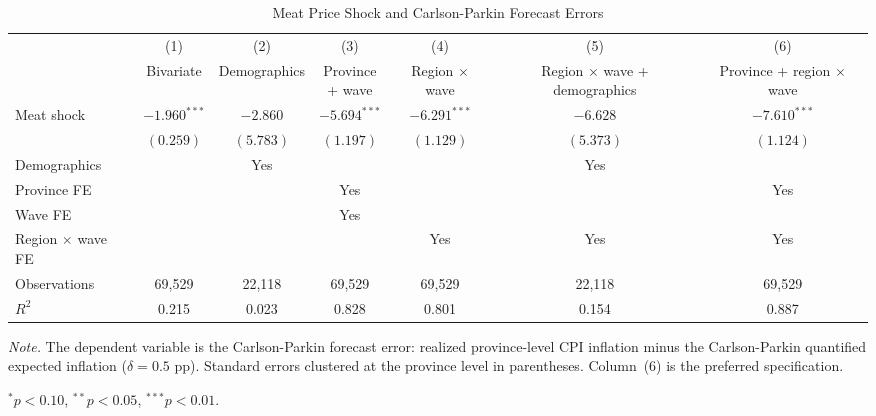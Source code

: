 \begin{table}[!htbp]
\centering
\caption{Meat Price Shock and Carlson-Parkin Forecast Errors}
\label{tab:eq3_carlson_parkin}
\begin{threeparttable}
\footnotesize
\setlength{\tabcolsep}{3pt}
\begin{tabular}{lcccccc}
\toprule
& (1) & (2) & (3) & (4) & (5) & (6) \\
& Bivariate & Demographics & \shortstack{Province\\+ wave} & \shortstack{Region\\$\times$ wave} & \shortstack{Region $\times$ wave\\+ demographics} & \shortstack{Province +\\region $\times$ wave} \\
\midrule
Meat shock & $-1.960^{***}$ & $-2.860$ & $-5.694^{***}$ & $-6.291^{***}$ & $-6.628$ & $-7.610^{***}$ \\
& $(0.259)$ & $(5.783)$ & $(1.197)$ & $(1.129)$ & $(5.373)$ & $(1.124)$ \\[6pt]
Demographics &  & Yes &  &  & Yes &  \\
Province FE &  &  & Yes &  &  & Yes \\
Wave FE &  &  & Yes &  &  &  \\
Region $\times$ wave FE &  &  &  & Yes & Yes & Yes \\
\midrule
Observations & 69,529 & 22,118 & 69,529 & 69,529 & 22,118 & 69,529 \\
$R^2$ & 0.215 & 0.023 & 0.828 & 0.801 & 0.154 & 0.887 \\
\bottomrule
\end{tabular}
\begin{tablenotes}[flushleft]
\footnotesize
\item \textit{Note.} The dependent variable is the Carlson-Parkin forecast error: realized province-level CPI inflation minus the Carlson-Parkin quantified expected inflation ($\delta = 0.5$ pp). Standard errors clustered at the province level in parentheses. Column~(6) is the preferred specification.
\item $^{*}p<0.10$, $^{**}p<0.05$, $^{***}p<0.01$.
\end{tablenotes}
\end{threeparttable}
\end{table}
